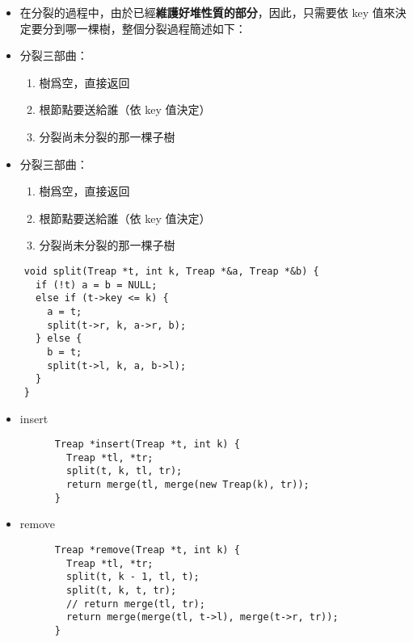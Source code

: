 \documentclass[standalone]{beamer}
\begin{document}
\begin{frame}[fragile]{}
  \begin{itemize}
    \item 在分裂的過程中，由於已經\textbf{維護好堆性質的部分}，因此，只需要依 key 值來決定要分到哪一棵樹，整個分裂過程簡述如下：

    \item 
    分裂三部曲：
    \begin{enumerate}
      \item 樹爲空，直接返回
      \item 根節點要送給誰（依 key 值決定）
      \item 分裂尚未分裂的那一棵子樹
    \end{enumerate}
  \end{itemize}
\end{frame}

\begin{frame}[fragile]{}
  \begin{itemize}
    \item 
    分裂三部曲：
    \begin{enumerate}
      \item 樹爲空，直接返回
      \item 根節點要送給誰（依 key 值決定）
      \item 分裂尚未分裂的那一棵子樹
    \end{enumerate}
  \end{itemize}
\end{frame}

\begin{frame}[fragile]{}
  \begin{verbatim}
    void split(Treap *t, int k, Treap *&a, Treap *&b) {
      if (!t) a = b = NULL;
      else if (t->key <= k) {
        a = t;
        split(t->r, k, a->r, b);
      } else {
        b = t;
        split(t->l, k, a, b->l);
      }
    }
  \end{verbatim}
\end{frame}

\begin{frame}[fragile]{}
  \begin{itemize}
    \item insert
    \begin{verbatim}
      Treap *insert(Treap *t, int k) {
        Treap *tl, *tr;
        split(t, k, tl, tr);
        return merge(tl, merge(new Treap(k), tr));
      }
    \end{verbatim}
    \item remove
    \begin{verbatim}
      Treap *remove(Treap *t, int k) {
        Treap *tl, *tr;
        split(t, k - 1, tl, t);
        split(t, k, t, tr);
        // return merge(tl, tr);
        return merge(merge(tl, t->l), merge(t->r, tr));
      }
    \end{verbatim}
  \end{itemize}
\end{frame}
\end{document}
